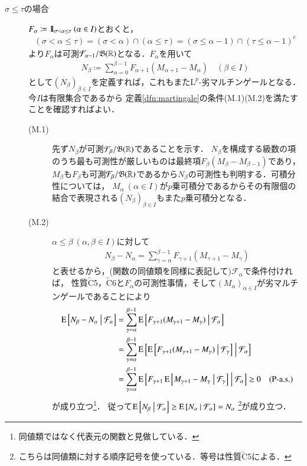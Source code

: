 	\begin{prf}\mbox{}
		\begin{description}
			\item[$\sigma \leq \tau$の場合]
				$F_\alpha \coloneqq \mbox{1}\hspace{-0.25em}\mbox{l}_{\sigma < \alpha \leq \tau}\ (\alpha \in I)$とおくと，
				\begin{align}
					(\sigma < \alpha \leq \tau) = (\sigma < \alpha) \cap (\alpha \leq \tau) = (\sigma \leq \alpha-1) \cap (\tau \leq \alpha-1)^c
				\end{align}
				より$F_\alpha$は可測$\mathcal{F}_{\alpha-1}/\mathfrak{B}(\mathbb{R})$となる．$F_\alpha$を用いて
				\begin{align}
					N_\beta \coloneqq \sum_{\alpha=0}^{\beta-1} F_{\alpha+1}(M_{\alpha+1} - M_\alpha) \quad (\beta \in I)
				\end{align}
				として$(N_\beta)_{\beta \in I}$を定義すれば，これもまた$\mathrm{L}^p$-劣マルチンゲールとなる．今$I$は有限集合であるから
				定義\ref{dfn:martingale}の条件(M.1)(M.2)を満たすことを確認すればよい．
				\begin{description}
					\item[(M.1)] 先ず$N_\beta$が可測$\mathcal{F}_\beta/\mathfrak{B}(\mathbb{R})$であることを示す．
						$N_\beta$を構成する級数の項のうち最も可測性が厳しいものは最終項$F_{\beta}(M_{\beta} - M_{\beta-1})$であり，
						$M_\beta$も$F_{\beta}$も可測$\mathcal{F}_\beta/\mathfrak{B}(\mathbb{R})$であるから$N_\beta$の可測性も判明する．可積分性については，
						$M_\alpha\ (\alpha \in I)$が$p$乗可積分であるからその有限個の結合で表現される$(N_\beta)_{\beta \in I}$もまた$p$乗可積分となる．
					\item[(M.2)]	
						$\alpha \leq \beta\ (\alpha,\beta \in I)$に対して
						\begin{align}
							N_{\beta} - N_{\alpha} = \sum_{\gamma=\alpha}^{\beta-1} F_{\gamma+1}(M_{\gamma+1} - M_\gamma)
						\end{align}
						と表せるから，(関数の同値類を同様に表記して)$\mathcal{F}_{\alpha}$で条件付ければ，
						性質$\tilde{\mathrm{C}}$5，$\tilde{\mathrm{C}}$6と$F_\alpha$の可測性事情，そして$(M_\alpha)_{\alpha \in I}$が劣マルチンゲールであることにより
						\begin{align}
							\operatorname{E} \left[ N_{\beta} - N_{\alpha} \ \middle|\ \mathcal{F}_\alpha \right]
							&= \sum_{\gamma=\alpha}^{\beta-1} \operatorname{E} \left[ F_{\gamma+1}(M_{\gamma+1} - M_\gamma) \ \middle|\ \mathcal{F}_\alpha \right] \\
							&= \sum_{\gamma=\alpha}^{\beta-1} \operatorname{E} \left[ \operatorname{E} \left[ F_{\gamma+1}(M_{\gamma+1} - M_\gamma) \ \middle|\ \mathcal{F}_\gamma \right] \ \middle|\ \mathcal{F}_\alpha \right] \\
							&= \sum_{\gamma=\alpha}^{\beta-1} \operatorname{E} \left[ F_{\gamma+1}\operatorname{E} \left[ M_{\gamma+1} - M_\gamma \ \middle|\ \mathcal{F}_\gamma \right] \ \middle|\ \mathcal{F}_\alpha \right]
							\geq 0\quad (\mbox{P-a.s.})
						\end{align}
						が成り立つ\footnote{同値類ではなく代表元の関数と見做している．}．
						従って$\operatorname{E} \left[ N_{\beta} \ \middle|\ \mathcal{F}_\alpha \right] \geq \operatorname{E} \left[ N_{\alpha} \ \middle|\ \mathcal{F}_\alpha \right] = N_\alpha$
						\footnote{こちらは同値類に対する順序記号を使っている．等号は性質$\tilde{\mathrm{C}}$5による．}が成り立つ．
				\end{description}
				
		\end{description}
	\end{prf}